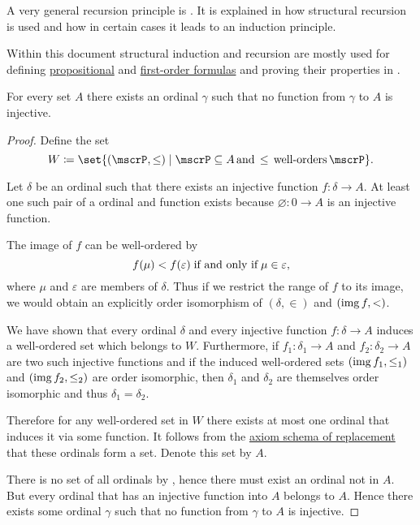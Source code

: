 \begin{remark}
\begin{thmenum}
     A very general recursion principle is . It is explained in  how structural recursion is used and how in certain cases it leads to an induction principle.

    Within this document structural induction and recursion are mostly used for defining \hyperref[def:propositional_syntax/formula]{propositional} and \hyperref[def:first_order_syntax/formula]{first-order formulas} and proving their properties in .
  \end{thmenum}
\end{remark}

\begin{theorem}\label{thm:hartogs_lemma}
  For every set \( A \) there exists an ordinal \( \gamma \) such that no function from \( \gamma \) to \( A \) is injective.
\end{theorem}
\begin{proof}
  Define the set
  \begin{equation*}
    W \coloneqq \set{ (\mscrP, \leq) \given \mscrP \subseteq A \T*{and} \leq \T*{well-orders} \mscrP }.
  \end{equation*}

  Let \( \delta \) be an ordinal such that there exists an injective function \( f: \delta \to A \). At least one such pair of a ordinal and function exists because \( \varnothing: 0 \to A \) is an injective function.

  The image of \( f \) can be well-ordered by
  \begin{equation*}
    f(\mu) < f(\varepsilon) \T{if and only if} \mu \in \varepsilon,
  \end{equation*}
  where \( \mu \) and \( \varepsilon \) are members of \( \delta \). Thus if we restrict the range of \( f \) to its image, we would obtain an explicitly order isomorphism of \( (\delta, \in) \) and \( (\operatorname{img} f, <) \).

  We have shown that every ordinal \( \delta \) and every injective function \( f: \delta \to A \) induces a well-ordered set which belongs to \( W \). Furthermore, if \( f_1: \delta_1 \to A \) and \( f_2: \delta_2 \to A \) are two such injective functions and if the induced well-ordered sets \( (\operatorname{img} f_1, \leq_1) \) and \( (\operatorname{img} f_2, \leq_2) \) are order isomorphic, then \( \delta_1 \) and \( \delta_2 \) are themselves order isomorphic and thus \( \delta_1 = \delta_2 \).

  Therefore for any well-ordered set in \( W \) there exists at most one ordinal that induces it via some function. It follows from the \hyperref[def:zfc/replacement]{axiom schema of replacement} that these ordinals form a set. Denote this set by \( A \).

  There is no set of all ordinals by , hence there must exist an ordinal not in \( A \). But every ordinal that has an injective function into \( A \) belongs to \( A \). Hence there exists some ordinal \( \gamma \) such that no function from \( \gamma \) to \( A \) is injective.
\end{proof}

